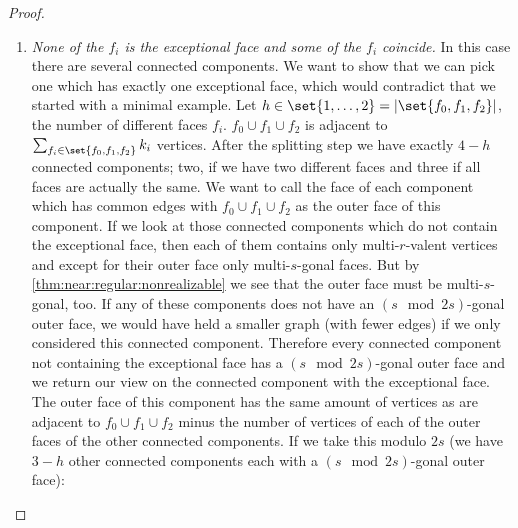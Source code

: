 \begin{proposition}
\begin{proof}
\begin{enumerate}
  \item {\it None of the $f_i$ is the exceptional face and some of the $f_i$ coincide.} In this case there are several connected components. We want to show that we can pick one which has exactly one exceptional face, which would contradict that we started with a minimal example. Let $h \in \set{1, \dots, 2} = |\set{f_0, f_1, f_2}|$, the number of different faces $f_i$. $f_0 \cup f_1 \cup f_2$ is adjacent to $\sum_{f_i \in \set{f_0, f_1, f_2}} k_i$ vertices. After the splitting step we have exactly $4 - h$ connected components; two, if we have two different faces and three if all faces are actually the same. We want to call the face of each component which has common edges with $f_0 \cup f_1 \cup f_2$ as the outer face of this component. If we look at those connected components which do not contain the exceptional face, then each of them contains only multi-$r$-valent vertices and except for their outer face only multi-$s$-gonal faces. But by \autoref{thm:near:regular:nonrealizable} we see that the outer face must be multi-$s$-gonal, too. If any of these components does not have an $(s \mod 2s)$-gonal outer face, we would have held a smaller graph (with fewer edges) if we only considered this connected component. Therefore every connected component not containing the exceptional face has a $(s \mod 2s)$-gonal outer face and we return our view on the connected component with the exceptional face. The outer face of this component has the same amount of vertices as are adjacent to $f_0 \cup f_1 \cup f_2$ minus the number of vertices of each of the outer faces of the other connected components. If we take this modulo $2s$ (we have $3 - h$ other connected components each with a $(s \mod 2s)$-gonal outer face):


\end{enumerate}
\end{proof}
\end{proposition}
